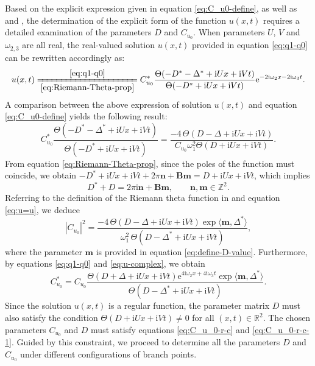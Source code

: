 \documentclass[11pt,reqno]{amsart}
\newcommand{\ii}{\mathrm{i}}
\newcommand{\ee}{\mathrm{e}}
\numberwithin{equation}{section}
\begin{document}
\newenvironment{proof-solution-dn}{\emph{\textbf{Proof of \Cref{theorem:solution-u}.}}}{\hfill$\Box$\medskip}
\begin{proof-solution-dn}
	Based on the explicit expression given in equation \eqref{eq:C_u0-define}, as well as  and , the determination of the explicit form of the function $u(x,t)$ requires a detailed examination of the parameters $D$ and $C_{u_0}$. 
	When parameters $U$, $V$ and $\omega_{2,3}$ are all real, the real-valued solution $u(x,t)$ provided in equation \eqref{eq:q1-q0} can be rewritten accordingly as:
	\begin{equation}\label{eq:u-complex}
		u(x,t)\xlongequal[\eqref{eq:Riemann-Theta-prop}]{\eqref{eq:q1-q0}}C^*_{u_0}\frac{\Theta(-D^*-\Delta^*+\ii Ux+\ii V t)}{\Theta(-D^*+\ii Ux+\ii V t)}\ee^{-2\ii \omega_2 x-2\ii \omega_3  t}.
	\end{equation}
	A comparison between the above expression of solution $u(x,t)$ and equation \eqref{eq:C_u0-define}
	yields the following result:
	\begin{equation}\label{eq:u=u}
		C^*_{u_0}\frac{\Theta\left(-D^*-\Delta^*+\ii Ux+\ii V t\right)}{\Theta\left(-D^*+\ii Ux+\ii V t\right)}
		=\frac{-4\, \Theta\left(D-\Delta+\ii Ux+\ii Vt\right)}{C_{u_0}\omega_1^2\Theta\left(D+\ii Ux+\ii Vt\right)}.
	\end{equation}
	From equation \eqref{eq:Riemann-Theta-prop}, since the poles of the function must coincide, we obtain $-D^*+\ii Ux+\ii Vt+2\pi \mathbf{n}+\mathbf{Bm}=D+\ii Ux+\ii Vt$, which implies
	\begin{equation}\label{eq:define-D-value}
		D^*+D=2\pi \ii\mathbf{n}+\mathbf{B}\mathbf{m}, \qquad \mathbf{n}, \mathbf{m}\in \mathbb{Z}^2.
	\end{equation}
	Referring to the definition of the Riemann theta function in  and  equation \eqref{eq:u=u},
	we deduce 
	\begin{equation}\label{eq:C_u_0-r-c}
		|C_{u_0}|^2=\frac{-4\, \Theta(D-\Delta+\ii U x+\ii V t)\exp\langle \mathbf{m}, \Delta^*\rangle}{\omega_1^2 \, \Theta(D-\Delta^*+\ii U x+\ii V t)},
	\end{equation}	
	where the parameter $\mathbf{m}$ is provided in equation \eqref{eq:define-D-value}.
	Furthermore, by equations \eqref{eq:q1-q0} and \eqref{eq:u-complex}, we obtain
	\begin{equation}\label{eq:C_u_0-r-c-1}
		C^*_{u_0}=C_{u_0}\frac{\Theta(D+\Delta+\ii Ux+\ii V t)\ee^{4\ii \omega_2 x+4\ii \omega_3  t}\exp\langle \mathbf{m}, \Delta^*\rangle}{\Theta(D-\Delta^*+\ii Ux+\ii V t)}.
	\end{equation}
	Since the solution $u(x,t)$ is a regular function, the parameter matrix $D$ must also satisfy the condition $\Theta(D+\ii Ux+\ii Vt)\neq0$ for all $(x,t)\in \mathbb{R}^2$. 
	The chosen parameters $C_{u_0}$ and $D$ must satisfy equations \eqref{eq:C_u_0-r-c} and \eqref{eq:C_u_0-r-c-1}.
	Guided by this constraint, we proceed to determine all the parameters $D$ and $C_{u_0}$ under different configurations of branch points.
	

\end{proof-solution-dn}
\end{document}
